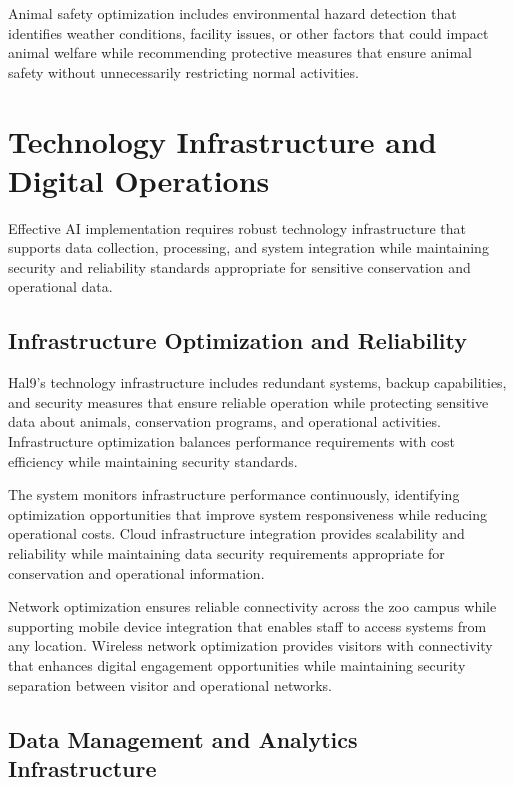 \documentclass[
  Letterpaper,
]{scrbook}
\begin{document}
Animal safety optimization includes environmental hazard detection that
identifies weather conditions, facility issues, or other factors that
could impact animal welfare while recommending protective measures that
ensure animal safety without unnecessarily restricting normal
activities.

\section{Technology Infrastructure and Digital
Operations}\label{technology-infrastructure-and-digital-operations}

Effective AI implementation requires robust technology infrastructure
that supports data collection, processing, and system integration while
maintaining security and reliability standards appropriate for sensitive
conservation and operational data.

\subsection{Infrastructure Optimization and
Reliability}\label{infrastructure-optimization-and-reliability}

Hal9's technology infrastructure includes redundant systems, backup
capabilities, and security measures that ensure reliable operation while
protecting sensitive data about animals, conservation programs, and
operational activities. Infrastructure optimization balances performance
requirements with cost efficiency while maintaining security standards.

The system monitors infrastructure performance continuously, identifying
optimization opportunities that improve system responsiveness while
reducing operational costs. Cloud infrastructure integration provides
scalability and reliability while maintaining data security requirements
appropriate for conservation and operational information.

Network optimization ensures reliable connectivity across the zoo campus
while supporting mobile device integration that enables staff to access
systems from any location. Wireless network optimization provides
visitors with connectivity that enhances digital engagement
opportunities while maintaining security separation between visitor and
operational networks.

\subsection{Data Management and Analytics
Infrastructure}\label{data-management-and-analytics-infrastructure}
\end{document}
